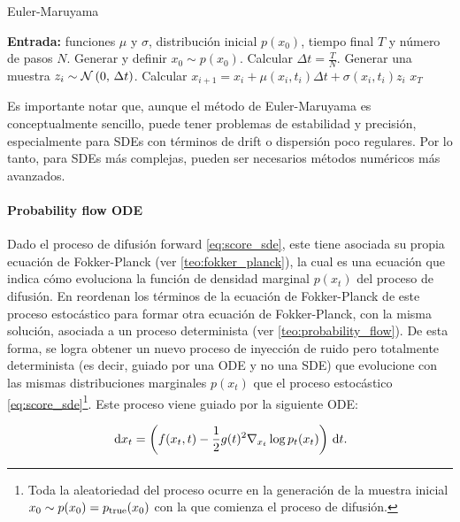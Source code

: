 \begin{algorithm}
    \caption{Euler-Maruyama}
    \label{alg:euler-maruyama}
    \begin{algorithmic}[1]
        \State \textbf{Entrada:} funciones $\mu$ y $\sigma$, distribución inicial $p(x_0)$, tiempo final $T$ y número de pasos $N$.
        \State Generar y definir $x_0\sim p(x_0)$.
        \State Calcular $\Delta t = \frac{T}{N}$.
        \State Generar una muestra $z_i\sim\mathcal{N}\left(0,\,\Delta t\right)$.
        \State Calcular $x_{i+1} = x_i + \mu(x_i, t_i) \Delta t + \sigma(x_i, t_i) z_i$
        \EndFor
        \State \Return $x_T$
    \end{algorithmic}
\end{algorithm}

Es importante notar que, aunque el método de Euler-Maruyama es conceptualmente sencillo, puede tener problemas de estabilidad y precisión, especialmente para SDEs con términos de drift o dispersión poco regulares. Por lo tanto, para SDEs más complejas, pueden ser necesarios métodos numéricos más avanzados.

\paragraph{Probability flow ODE}

Dado el proceso de difusión forward \eqref{eq:score_sde}, este tiene asociada su propia ecuación de Fokker-Planck (ver \autoref{teo:fokker_planck}), la cual es una ecuación que indica cómo evoluciona la función de densidad marginal $p(x_t)$ del proceso de difusión. En \cite{song2021scorebased} reordenan los términos de la ecuación de Fokker-Planck de este proceso estocástico para formar otra ecuación de Fokker-Planck, con la misma solución, asociada a un proceso determinista (ver \autoref{teo:probability_flow}). De esta forma, se logra obtener un nuevo proceso de inyección de ruido pero totalmente determinista (es decir, guiado por una ODE y no una SDE) que evolucione con las mismas distribuciones marginales $p(x_t)$ que el proceso estocástico \eqref{eq:score_sde}\footnote{Toda la aleatoriedad del proceso ocurre en la generación de la muestra inicial $x_0\sim p(x_0)=p_{\operatorname{true}}(x_0)$ con la que comienza el proceso de difusión.}. Este proceso viene guiado por la siguiente ODE:

\begin{equation}
    \label{eq:probability_flow_dm}
    \,\operatorname{d}\! x_t = \left(f(x_t,t)-\frac{1}{2}g(t)^2\nabla_{x_t} \log p_t(x_t)\right)\,\operatorname{d}\! t.
\end{equation}

